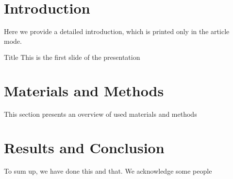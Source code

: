 %
%


\usepackage{graphicx}          %
\usepackage{hyperref}          %
\usepackage{booktabs, caption} %
\usepackage{amsmath}
\usepackage{mhchem}            %
\usepackage{xcolor}            %


\usepackage{fontspec}
\setsansfont{Fontin}









\section{Introduction}
  Here we provide a detailed introduction, which is printed only in the article mode.
  \begin{frame}{Title}
    This is the first slide of the presentation
  \end{frame}


\section{Materials and Methods}
  This section presents an overview of used materials and methods


\section{Results and Conclusion}
  To sum up, we have done this and that. We acknowledge some people





